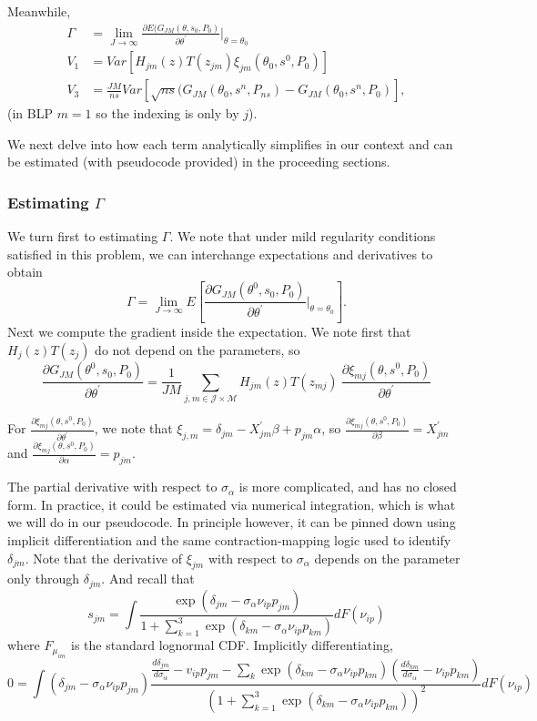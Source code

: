 \documentclass{article}
\begin{document}
\begin{enumerate}
\begin{enumerate}
\begin{answer}
Meanwhile, 
\begin{align*}
  \Gamma &= \lim_{J \to \infty} \frac{\partial E(G_{JM}(\theta,s_0,P_0)}{\partial \theta^\prime }|_{\theta=\theta_0}  \\
  V_1 &= Var[H_{jm}(z)T(z_{jm})\xi_{jm}(\theta_0,s^0,P_0)] \\
  V_3 &= \frac{JM}{ns}Var[\sqrt{ns} (G_{JM}(\theta_0,s^n,P_{ns})-G_{JM}(\theta_0,s^n,P_0)],
\end{align*}
(in BLP $m=1$ so the indexing is only by $j$).

 We next delve into how each term analytically simplifies in our context and can be estimated (with pseudocode provided) in the proceeding sections. 

\subsubsection*{Estimating $\Gamma$}

We turn first to estimating $\Gamma$. We note that under mild regularity conditions satisfied in this problem, we can interchange expectations and derivatives to obtain 
$$\Gamma= \lim_{J \to \infty} E\left[\frac{\partial G_{JM}(\theta^0,s_0,P_0)}{\partial \theta^\prime }|_{\theta=\theta_0}\right].$$
Next we compute the gradient inside the expectation. We note first that $H_j(z)T(z_j)$ do not depend on the parameters, so $$\frac{\partial G_{JM}(\theta^0,s_0,P_0)}{\partial \theta^\prime }= 
 \frac{1}{JM} \sum_{j,m\in\mathcal{J}\times \mathcal{M}}H_{jm}(z)T(z_{mj})\
\frac{\partial \xi_{mj}(\theta,s^0,P_0)}{\partial \theta^\prime }$$

For $\frac{\partial \xi_{mj}(\theta,s^0,P_0)}{\partial \theta^\prime}$, we note that $\xi_{j,m}= \delta_{jm}- X_{jm}^\prime \beta + p_{jm}\alpha  $, so  $\frac{\partial \xi_{mj}(\theta,s^0,P_0)}{\partial \beta} = X_{jm}^\prime $ and $\frac{\partial \xi_{mj}(\theta,s^0,P_0)}{\partial \alpha} = p_{jm} .$ 

The partial derivative with respect to $\sigma_\alpha$ is more complicated, and has no closed form. In practice, it could be estimated via numerical integration, which is what we will do in our pseudocode. In principle however, it can be pinned down using implicit differentiation and the same contraction-mapping logic used to identify $\delta_{jm}$. Note that the derivative of $\xi_{jm}$ with respect to $\sigma_\alpha$ depends on the parameter only through $\delta_{jm}$. And recall that $$s_{jm}=\int  \frac{\exp(\delta_{jm} - \sigma_\alpha \nu_{ip} p_{jm})}{
    1 + \sum_{k=1}^3 \exp(\delta_{km} - \sigma_\alpha \nu_{ip}p_{km} )
    }dF(\nu_{ip})$$
where $F_{\mu_{im}}$ is the standard lognormal CDF.
Implicitly differentiating, 
$$0=\int (\delta_{jm} - \sigma_\alpha \nu_{ip} p_{jm}) \frac{\frac{d\delta_{jm}}{d\sigma_{\alpha}}-v_{ip}p_{jm} -\sum_k \exp(\delta_{km} - \sigma_\alpha \nu_{ip}p_{km} )(\frac{d\delta_{km}}{d\sigma_{\alpha}}- \nu_{ip}p_{km})}{ \left(1 + \sum_{k=1}^3 \exp(\delta_{km} - \sigma_\alpha \nu_{ip}p_{km} )
    \right)^2}dF(\nu_{ip})$$


\end{answer}
\end{enumerate}
\end{enumerate}
\end{document}
